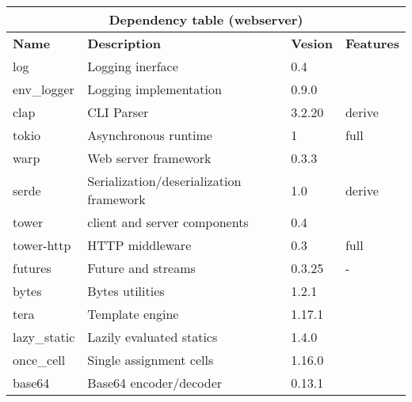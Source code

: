 \documentclass[../documentation.tex]{subfiles}
\begin{document}
\bgroup{}
\def\arraystretch{1.5}
\begin{center}
    \begin{tabular}{ |p{2cm}|p{4cm}|p{1.5cm}|p{2cm}| }
        \hline
        \multicolumn{4}{|c|}{\textbf{Dependency table (webserver)}} \\
        \hline
        \textbf{Name} & \textbf{Description} & \textbf{Vesion} & \textbf{Features} \\
        \hline
        log & Logging inerface & 0.4 & \\
        \hline
        env\_logger & Logging implementation & 0.9.0 & \\
        \hline
        clap & CLI Parser & 3.2.20 & derive \\
        \hline
        tokio & Asynchronous runtime & 1 & full \\
        \hline
        warp & Web server framework & 0.3.3 &  \\
        \hline
        serde & Serialization/deserialization framework & 1.0 & derive \\
        \hline
        tower & client and server components & 0.4 & \\
        \hline
        tower-http & HTTP middleware & 0.3 & full \\
        \hline
        futures & Future and streams & 0.3.25 & - \\
        \hline
        bytes & Bytes utilities & 1.2.1 & \\
        \hline
        tera & Template engine & 1.17.1 & \\
        \hline
        lazy\_static & Lazily evaluated statics & 1.4.0 & \\
        \hline
        once\_cell & Single assignment cells & 1.16.0 & \\
        \hline
        base64 & Base64 encoder/decoder & 0.13.1 & \\
        \hline
    \end{tabular}
\end{center}
\egroup{}
\end{document}
